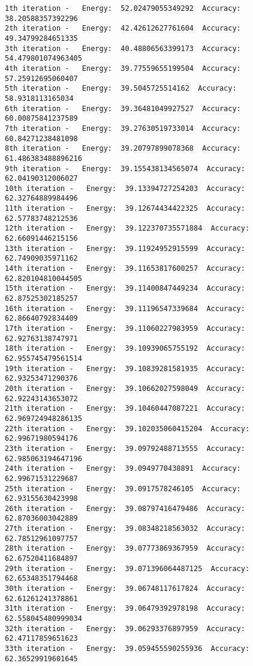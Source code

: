 \documentclass[11pt]{article}
\begin{document}
    \begin{Verbatim}[commandchars=\\\{\}]
1th iteration -   Energy:  52.02479055349292  Accuracy:  38.20588357392296
2th iteration -   Energy:  42.42612627761604  Accuracy:  49.34799284651335
3th iteration -   Energy:  40.48806563399173  Accuracy:  54.479801074963405
4th iteration -   Energy:  39.77559655199504  Accuracy:  57.25912695060407
5th iteration -   Energy:  39.5045725514162  Accuracy:  58.9318113165034
6th iteration -   Energy:  39.36481049927527  Accuracy:  60.00875841237589
7th iteration -   Energy:  39.27630519733014  Accuracy:  60.84271238481098
8th iteration -   Energy:  39.20797899078368  Accuracy:  61.486383488896216
9th iteration -   Energy:  39.155438134565074  Accuracy:  62.04190312006027
10th iteration -   Energy:  39.13394727254203  Accuracy:  62.32764889984496
11th iteration -   Energy:  39.12674434422325  Accuracy:  62.57783748212536
12th iteration -   Energy:  39.122370735571884  Accuracy:  62.66091446215156
13th iteration -   Energy:  39.11924952915599  Accuracy:  62.74909035971162
14th iteration -   Energy:  39.11653817600257  Accuracy:  62.820104810044505
15th iteration -   Energy:  39.11400847449234  Accuracy:  62.87525302185257
16th iteration -   Energy:  39.11196547339684  Accuracy:  62.86640792834409
17th iteration -   Energy:  39.11060227983959  Accuracy:  62.92763138747971
18th iteration -   Energy:  39.10939065755192  Accuracy:  62.955745479561514
19th iteration -   Energy:  39.10839281581935  Accuracy:  62.93253471290376
20th iteration -   Energy:  39.10662027598049  Accuracy:  62.92243143653072
21th iteration -   Energy:  39.10460447087221  Accuracy:  62.969724948286135
22th iteration -   Energy:  39.102035060415204  Accuracy:  62.99671980594176
23th iteration -   Energy:  39.09792488713555  Accuracy:  62.985063194647196
24th iteration -   Energy:  39.0949770438891  Accuracy:  62.99671531229687
25th iteration -   Energy:  39.0917578246105  Accuracy:  62.93155630423998
26th iteration -   Energy:  39.08797416479486  Accuracy:  62.87036003042889
27th iteration -   Energy:  39.08348218563032  Accuracy:  62.78512961097757
28th iteration -   Energy:  39.07773869367959  Accuracy:  62.67520411684897
29th iteration -   Energy:  39.071396064487125  Accuracy:  62.65348351794468
30th iteration -   Energy:  39.06748117617824  Accuracy:  62.61261241378861
31th iteration -   Energy:  39.06479392978198  Accuracy:  62.558045480999034
32th iteration -   Energy:  39.06293376897959  Accuracy:  62.47117859651623
33th iteration -   Energy:  39.059455590255936  Accuracy:  62.36529919601645

\end{Verbatim}
\end{document}
